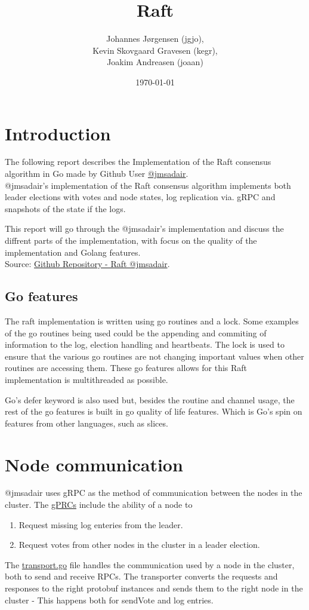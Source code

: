 \documentclass[a4paper,11pt]{article}
\title{Raft}
\author{Johannes Jørgensen (jgjo),\\ Kevin Skovgaard Gravesen (kegr),\\ Joakim Andreasen (joaan)}
\date{\today}
\begin{document}
 

\maketitle

\section*{Introduction}
The following report describes the Implementation of the Raft consensus algorithm in Go made by Github User \href{https://github.com/jmsadair/}{@jmsadair}.
\\@jmsadair's implementation of the Raft consensus algorithm implements both leader elections with votes and node states, log replication via. gRPC and snapshots of the state if the logs.

This report will go through the @jmsadair's implementation and discuss the diffrent parts of the implementation, with focus on the quality of the implementation and Golang features.
\\

Source: \href{https://github.com/jmsadair/raft}{Github Repository - Raft @jmsadair}.
\subsection*{Go features}
The raft implementation is written using go routines and a lock.
Some examples of the go routines being used could be the appending and commiting of information to the log, election handling and heartbeats.
The lock is used to ensure that the various go routines are not changing important values when other routines are accessing them.
These go features allows for this Raft implementation is multithreaded as possible.

Go's defer keyword is also used but, besides the routine and channel usage, the rest of the go features is built in go quality of life features.
Which is Go's spin on features from other languages, such as slices.
\\
\section*{Node communication}
@jmsadair uses gRPC as the method of communication between the nodes in the cluster. The \href{https://github.com/jmsadair/raft/blob/dev/internal/protobuf/raft.proto}{gPRCs} include the ability of a node to 
\begin{enumerate}[label=\arabic*.]
    \item Request missing log enteries from the leader.
    \item Request votes from other nodes in the cluster in a leader election. 
\end{enumerate}
The \href{https://github.com/jmsadair/raft/blob/dev/transport.go}{transport.go} file handles the communication used by a node in the cluster, both to send and receive RPCs. 
The transporter converts the requests and responses to the right protobuf instances and sends them to the right node in the cluster - This happens both for sendVote and log entries. 
\end{document}
